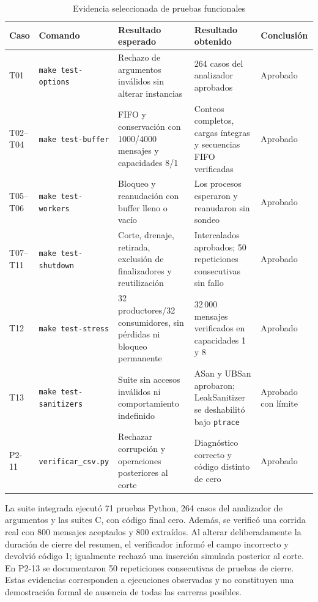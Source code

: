 \documentclass[conference]{IEEEtran}
\begin{document}
\begin{table}[htbp]
\caption{Evidencia seleccionada de pruebas funcionales}\label{tab:pruebas}
\centering\footnotesize
\setlength{\tabcolsep}{3pt}
\begin{tabular}{p{}p{}p{}p{}p{}}
\toprule
Caso & Comando & Resultado esperado & Resultado obtenido & Conclusión \\
\midrule
T01 & \texttt{make test-options} & Rechazo de argumentos inválidos sin alterar instancias & 264 casos del analizador aprobados & Aprobado \\
T02--T04 & \texttt{make test-buffer} & FIFO y conservación con 1000/4000 mensajes y capacidades 8/1 & Conteos completos, cargas íntegras y secuencias FIFO verificadas & Aprobado \\
T05--T06 & \texttt{make test-workers} & Bloqueo y reanudación con buffer lleno o vacío & Los procesos esperaron y reanudaron sin sondeo & Aprobado \\
T07--T11 & \texttt{make test-shutdown} & Corte, drenaje, retirada, exclusión de finalizadores y reutilización & Intercalados aprobados; 50 repeticiones consecutivas sin fallo & Aprobado \\
T12 & \texttt{make test-stress} & 32 productores/32 consumidores, sin pérdidas ni bloqueo permanente & 32\,000 mensajes verificados en capacidades 1 y 8 & Aprobado \\
T13 & \texttt{make test-sanitizers} & Suite sin accesos inválidos ni comportamiento indefinido & ASan y UBSan aprobaron; LeakSanitizer se deshabilitó bajo \texttt{ptrace} & Aprobado con límite \\
P2-11 & \texttt{verificar\_csv.py} & Rechazar corrupción y operaciones posteriores al corte & Diagnóstico correcto y código distinto de cero & Aprobado \\
\bottomrule
\end{tabular}
\end{table}

La suite integrada ejecutó 71 pruebas Python, 264 casos del analizador de argumentos y las suites C, con código final cero. Además, se verificó una corrida real con 800 mensajes aceptados y 800 extraídos. Al alterar deliberadamente la duración de cierre del resumen, el verificador informó el campo incorrecto y devolvió código 1; igualmente rechazó una inserción simulada posterior al corte. En P2-13 se documentaron 50 repeticiones consecutivas de pruebas de cierre. Estas evidencias corresponden a ejecuciones observadas y no constituyen una demostración formal de ausencia de todas las carreras posibles.
\end{document}
